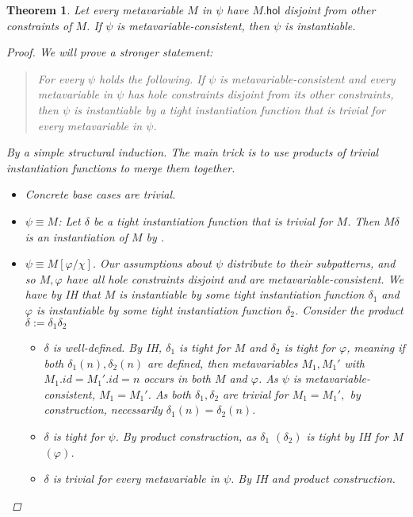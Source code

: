 \documentclass{article}
\numberwithin{deff}{section}
\numberwithin{lemma*}{section}
\newtheorem{theorem*}{Theorem}
\newcommand{\Hol}{\mathsf{hol}}
\begin{document}
\begin{theorem*}
  \label{theorem:disjoint_instantiability}
  Let every metavariable $M$ in $\psi$ have $M.\Hol$ disjoint from other constraints of $M$.
  If $\psi$ is metavariable-consistent, then $\psi$ is instantiable.

  \begin{proof}
    We will prove a stronger statement:
    \begin{quote}
      For every $\psi$ holds the following.
      If $\psi$ is metavariable-consistent and every metavariable in $\psi$ has hole constraints disjoint from its other constraints, then $\psi$ is instantiable by a \emph{tight} instantiation function that is trivial for every metavariable in $\psi$.
    \end{quote}

    By a simple structural induction.
    The main trick is to use products of trivial instantiation functions to merge them together.

    \begin{itemize}
      \item Concrete base cases are trivial.
      \item $\psi \equiv M$: Let $\delta$ be a tight instantiation function that is trivial for $M$.
      Then $M\delta$ is an instantiation of $M$ by .
      \item $\psi \equiv M[\varphi/\chi]$.
      Our assumptions about $\psi$ distribute to their subpatterns, and so $M, \varphi$ have all hole constraints disjoint and are metavariable-consistent.
      We have by IH that $M$ is instantiable by some tight instantiation function $\delta_1$ and $\varphi$ is instantiable by some tight instantiation function $\delta_2$.
      Consider the product $\delta := \delta_1 \delta_2$
      \begin{itemize}
        \item $\delta$ is well-defined. By IH, $\delta_1$ is tight for $M$ and $\delta_2$ is tight for $\varphi$, meaning if both $\delta_1(n), \delta_2(n)$ are defined, then metavariables $M_1, M_1'$ with $M_1.id = M_1'.id = n$ occurs in both $M$ and $\varphi$.
        As $\psi$ is metavariable-consistent, $M_1 = M_1'$.
        As both $\delta_1, \delta_2$ are \emph{trivial} for $M_1 = M_1',$ by construction, necessarily $\delta_1(n) = \delta_2(n)$.
        \item $\delta$ is tight for $\psi$. By product construction, as $\delta_1$ $(\delta_2)$ is tight by IH for $M$ $(\varphi)$.
        \item $\delta$ is trivial for every metavariable in $\psi$. By IH and product construction.
      \end{itemize}


\end{itemize}
\end{proof}
\end{theorem*}
\end{document}
